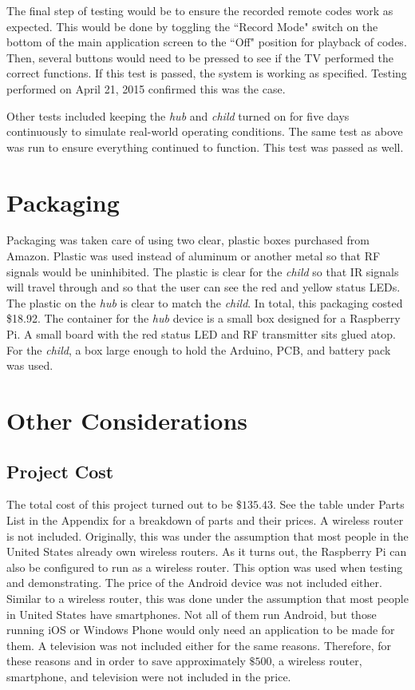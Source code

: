 \documentclass[12pt]{article}
\begin{document}
The final step of testing would be to ensure the recorded remote codes work as expected. This would be done by toggling the ``Record Mode" switch on the bottom of the main application screen to the ``Off" position for playback of codes. Then, several buttons would need to be pressed to see if the TV performed the correct functions. If this test is passed, the system is working as specified. Testing performed on April 21, 2015 confirmed this was the case.

Other tests included keeping the \emph{hub} and \emph{child} turned on for five days continuously to simulate real-world operating conditions. The same test as above was run to ensure everything continued to function. This test was passed as well. 

\section*{Packaging}
 Packaging was taken care of using two clear, plastic boxes purchased from Amazon. Plastic was used instead of aluminum or another metal so that RF signals would be uninhibited. The plastic is clear for the \emph{child} so that IR signals will travel through and so that the user can see the red and yellow status LEDs. The plastic on the \emph{hub} is clear to match the \emph{child}. In total, this packaging costed \$18.92. The container for the \emph{hub} device is a small box designed for a Raspberry Pi. A small board with the red status LED and RF transmitter sits glued atop. For the \emph{child}, a box large enough to hold the Arduino, PCB, and battery pack was used.

\section*{Other Considerations}
\subsection*{Project Cost}
The total cost of this project turned out to be $\$135.43$. See the table under Parts List in the Appendix for a breakdown of parts and their prices. A wireless router is not included. Originally, this was under the assumption that most people in the United States already own wireless routers. As it turns out, the Raspberry Pi can also be configured to run as a wireless router. This option was used when testing and demonstrating. The price of the Android device was not included either. Similar to a wireless router, this was done under the assumption that most people in United States have smartphones. Not all of them run Android, but those running iOS or Windows Phone would only need an application to be made for them. A television was not included either for the same reasons. Therefore, for these reasons and in order to save approximately $\$500$, a wireless router, smartphone, and television were not included in the price. 
\end{document}
